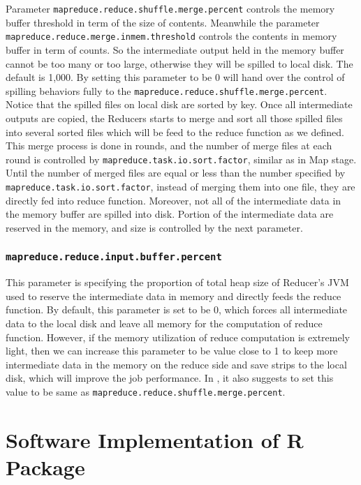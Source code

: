 Parameter \texttt{mapreduce.reduce.shuffle.merge.percent} controls the memory
buffer threshold in term of the size of contents. Meanwhile the parameter \\
\texttt{mapreduce.reduce.merge.inmem.threshold} controls the contents in memory
buffer in term of counts. So the intermediate output held in the memory buffer
cannot be too many or too large, otherwise they will be spilled to local disk.
The default is 1,000. By setting this parameter to be 0 will hand over the control
of spilling behaviors fully to the \texttt{mapreduce.reduce.shuffle.merge.percent}. 
Notice that the spilled files on local disk are sorted by key. Once all 
intermediate outputs are copied, the Reducers starts to merge and sort all those
spilled files into several sorted files which will be feed to the reduce function
as we defined. This merge process is done in rounds, and the number of merge files
at each round is controlled by \texttt{mapreduce.task.io.sort.factor}, similar 
as in Map stage. Until the number of merged files are equal or less than the number 
specified by \\ \texttt{mapreduce.task.io.sort.factor}, instead of merging them 
into one file, they are directly fed into reduce function. Moreover, not all
of the intermediate data in the memory buffer are spilled into disk. Portion of 
the intermediate data are reserved in the memory, and size is controlled by the
next parameter.

\subsubsection{\texttt{mapreduce.reduce.input.buffer.percent}}

This parameter is specifying the proportion of total heap size of Reducer's JVM
used to reserve the intermediate data in memory and directly feeds the reduce
function. By default, this parameter is set to be 0, which forces all intermediate
data to the local disk and leave all memory for the computation of reduce function.
However, if the memory utilization of reduce computation is extremely light, then
we can increase this parameter to be value close to 1 to keep more intermediate
data in the memory on the reduce side and save strips to the local disk, which
will improve the job performance. In \cite{li2014mronline}, it also suggests to
set this value to be same as \texttt{mapreduce.reduce.shuffle.merge.percent}. 

\section{Software Implementation of R Package}

